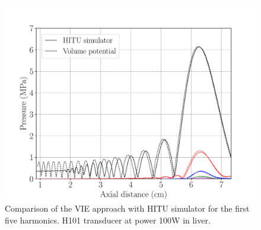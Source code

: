 \documentclass[11pt]{article}
\numberwithin{equation}{section}
\begin{document}
\begin{figure}[h!]
    \centering
    \includegraphics[width=\linewidth]{Figure6.pdf}
    \caption{Comparison of the VIE approach with HITU simulator for the first 
    five harmonics. H101 transducer at power 100W in liver.}
    \label{fig:HITU_comparison_H101}
\end{figure}
\end{document}
